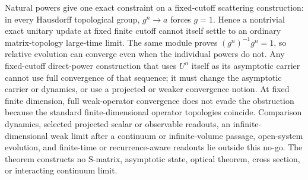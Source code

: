 Natural powers give one exact constraint on a fixed-cutoff scattering
construction: in every Hausdorff topological group, $g^n\to a$ forces
$g=1$.  Hence a nontrivial exact
unitary update at fixed finite cutoff cannot itself settle to an ordinary
matrix-topology large-time limit.  The same module proves
$(g^n)^{-1}g^n=1$, so relative evolution can converge even when the individual
powers do not.  Any fixed-cutoff direct-power construction that uses $U^n$
itself as its asymptotic carrier cannot use full convergence of that sequence;
it must change the asymptotic carrier or dynamics, or use a projected or
weaker convergence notion.  At fixed finite dimension, full weak-operator convergence
does not evade the obstruction because the standard finite-dimensional
operator topologies coincide.  Comparison dynamics, selected projected scalar
or observable readouts, an infinite-dimensional weak limit after a continuum or
infinite-volume passage, open-system evolution, and finite-time or
recurrence-aware readouts lie outside this no-go.  The theorem constructs no
S-matrix, asymptotic state, optical theorem, cross section, or interacting
continuum limit.

